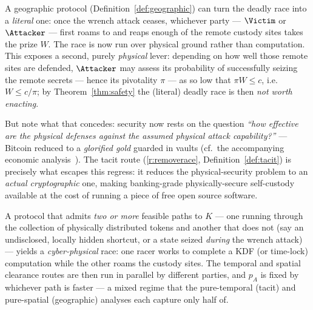 \begin{remark}\label{rem:literalrace}
A geographic protocol (Definition~\ref{def:geographic}) can turn the deadly race
into a \emph{literal} one: once the wrench attack ceases, whichever party ---
$\Victim$ or $\Attacker$ --- first roams to and reaps enough of the remote custody
sites takes the prize $W$. The race is now run over physical ground rather than
computation. This exposes a second, purely \emph{physical} lever: depending on how
well those remote sites are defended, $\Attacker$ may assess its probability of
successfully seizing the remote secrets --- hence its pivotality $\pi$ --- as so
low that $\pi W \le c$, i.e.\ $W \le c/\pi$; by Theorem~\ref{thm:safety} the
(literal) deadly race is then \emph{not worth enacting}.
\end{remark}

\begin{remark}\label{rem:physical-to-crypto}
But note what that concedes: security now rests on the question \emph{``how
effective are the physical defenses against the assumed physical attack
capability?''} --- Bitcoin reduced to a \emph{glorified gold} guarded in vaults
(cf.\ the accompanying economic analysis~\cite{gw-justification}). The tacit route (\ref{r:removerace}, Definition~\ref{def:tacit})
is precisely what escapes this regress: it reduces the physical-security problem to
an \emph{actual cryptographic} one, making banking-grade physically-secure
self-custody available at the cost of running a piece of free open source software.
\end{remark}

\begin{remark}\label{rem:cyberphysical}
A protocol that admits \emph{two or more} feasible paths to $K$ --- one running
through the collection of physically distributed tokens and another that does not
(say an undisclosed, locally hidden shortcut, or a state seized \emph{during} the
wrench attack) --- yields a \emph{cyber-physical} race: one racer works to complete
a KDF (or time-lock) computation while the other roams the custody sites. The
temporal and spatial clearance routes are then run in parallel by different
parties, and $p_A$ is fixed by whichever path is faster --- a mixed regime that the
pure-temporal (tacit) and pure-spatial (geographic) analyses each capture only half
of.
\end{remark}

